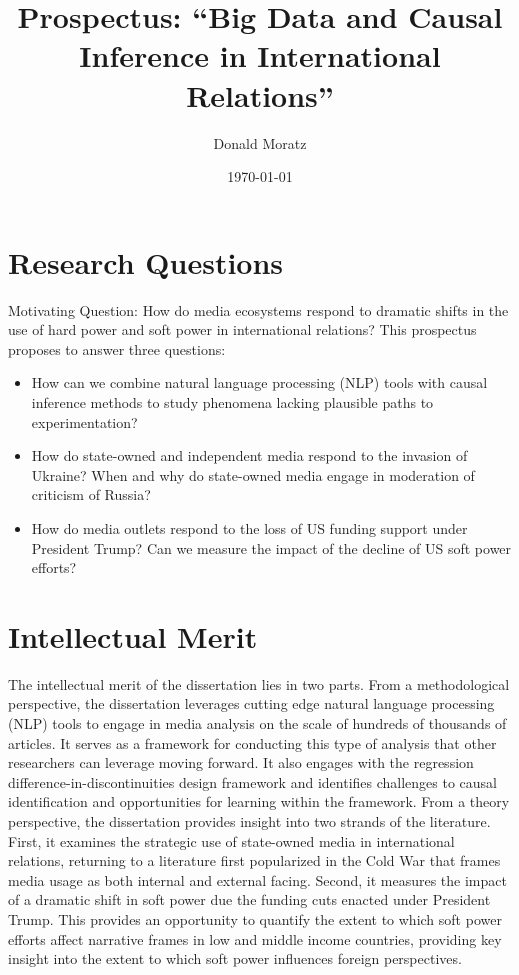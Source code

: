 \documentclass[12pt]{article}
\title{%
  Prospectus:
  ``Big Data and Causal Inference in International Relations''}
\author{Donald Moratz}
\date{\today}
\begin{document}
\maketitle

\abstract{}

\section*{Research Questions}
Motivating Question: How do media ecosystems respond to dramatic shifts in the use of hard power and soft power in international relations? This prospectus proposes to answer three questions:

\begin{itemize}
    \item How can we combine natural language processing (NLP) tools with causal inference methods to study phenomena lacking plausible paths to experimentation?
    \item How do state-owned and independent media respond to the invasion of Ukraine? When and why do state-owned media engage in moderation of criticism of Russia?
    \item How do media outlets respond to the loss of US funding support under President Trump? Can we measure the impact of the decline of US soft power efforts?
\end{itemize}

\section*{Intellectual Merit}

The intellectual merit of the dissertation lies in two parts. From a methodological perspective, the dissertation leverages cutting edge natural language processing (NLP) tools to engage in media analysis on the scale of hundreds of thousands of articles. It serves as a framework for conducting this type of analysis that other researchers can leverage moving forward. It also engages with the regression difference-in-discontinuities design framework and identifies challenges to causal identification and opportunities for learning within the framework. From a theory perspective, the dissertation provides insight into two strands of the literature. First, it examines the strategic use of state-owned media in international relations, returning to a literature first popularized in the Cold War that frames media usage as both internal and external facing. Second, it measures the impact of a dramatic shift in soft power due the funding cuts enacted under President Trump. This provides an opportunity to quantify the extent to which soft power efforts affect narrative frames in low and middle income countries, providing key insight into the extent to which soft power influences foreign perspectives.
\end{document}
